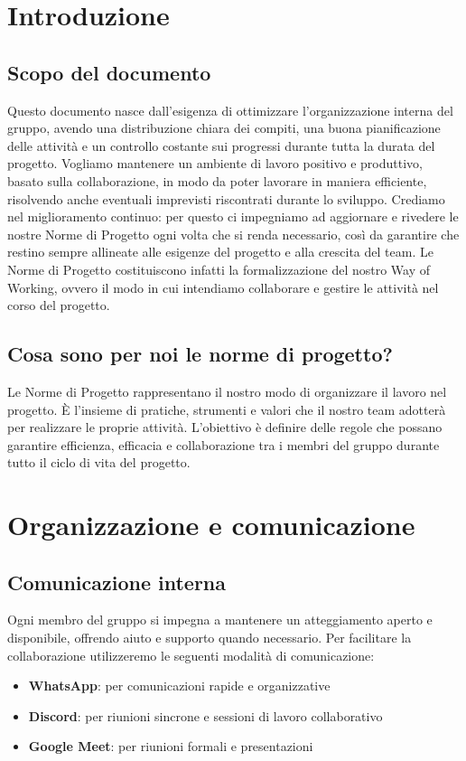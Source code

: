 \documentclass[11pt,a4paper]{article}
\begin{document}
\section{Introduzione}
\subsection{Scopo del documento}
Questo documento nasce dall’esigenza di ottimizzare l’organizzazione interna del gruppo, avendo una distribuzione chiara dei compiti, una buona pianificazione delle attività e un controllo costante sui progressi durante tutta la durata del progetto. Vogliamo mantenere un ambiente di
lavoro positivo e produttivo, basato sulla collaborazione, in modo da poter lavorare in maniera efficiente, risolvendo anche eventuali imprevisti riscontrati durante lo sviluppo.
Crediamo nel miglioramento continuo: per questo ci impegniamo ad aggiornare e rivedere le nostre Norme di Progetto ogni volta che si renda necessario, così da garantire che restino sempre allineate alle esigenze del progetto e alla crescita del team. Le Norme di Progetto costituiscono infatti la formalizzazione del nostro Way of Working, ovvero il modo in cui intendiamo collaborare e gestire le attività nel corso del progetto.

\subsection{Cosa sono per noi le norme di progetto?}
Le Norme di Progetto rappresentano il nostro modo di organizzare il lavoro nel progetto. È l’insieme di pratiche, strumenti e valori che il nostro team adotterà per realizzare le proprie attività. L’obiettivo è definire delle regole che possano garantire efficienza, efficacia e collaborazione tra i membri del gruppo durante tutto il ciclo di vita del progetto.

\newpage

\section{Organizzazione e comunicazione}

\subsection{Comunicazione interna}
Ogni membro del gruppo si impegna a mantenere un atteggiamento aperto e disponibile, offrendo aiuto e supporto quando necessario. Per facilitare la collaborazione utilizzeremo le seguenti modalità di comunicazione:
\begin{itemize}
    \item \textbf{WhatsApp}: per comunicazioni rapide e organizzative
    \item \textbf{Discord}: per riunioni sincrone e sessioni di lavoro collaborativo
    \item \textbf{Google Meet}: per riunioni formali e presentazioni
\end{itemize}
\end{document}
